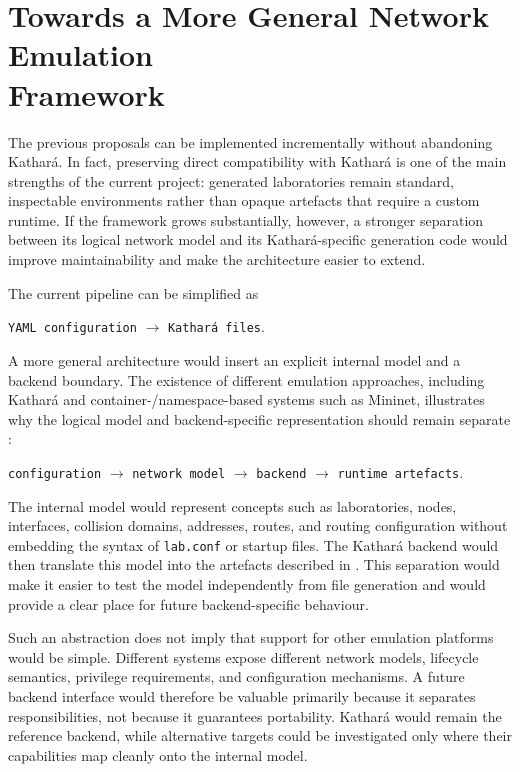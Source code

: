 \section[Towards a More General Network Emulation Framework]{Towards a More General Network Emulation\\Framework}
\label{sec:future-general-framework}

The previous proposals can be implemented incrementally without abandoning
Kathar\'a. In fact, preserving direct compatibility with Kathar\'a is one of the
main strengths of the current project: generated laboratories remain standard,
inspectable environments rather than opaque artefacts that require a custom
runtime. If the framework grows substantially, however, a stronger separation
between its logical network model and its Kathar\'a-specific generation code
would improve maintainability and make the architecture easier to extend.

The current pipeline can be simplified as

\begin{center}
\texttt{YAML configuration} $\rightarrow$ \texttt{Kathar\'a files}.
\end{center}

A more general architecture would insert an explicit internal model and a
backend boundary. The existence of different emulation approaches, including
Kathar\'a and container-/namespace-based systems such as Mininet, illustrates
why the logical model and backend-specific representation should remain
separate \cite{scazzariello2020kathara,lantz2010network}:

\begin{center}
\texttt{configuration} $\rightarrow$ \texttt{network model}
$\rightarrow$ \texttt{backend} $\rightarrow$ \texttt{runtime artefacts}.
\end{center}

The internal model would represent concepts such as laboratories, nodes,
interfaces, collision domains, addresses, routes, and routing configuration
without embedding the syntax of \texttt{lab.conf} or startup files. The
Kathar\'a backend would then translate this model into the artefacts described
in . This separation would make it easier to
test the model independently from file generation and would provide a clear
place for future backend-specific behaviour.

Such an abstraction does not imply that support for other emulation platforms
would be simple. Different systems expose different network models, lifecycle
semantics, privilege requirements, and configuration mechanisms. A future
backend interface would therefore be valuable primarily because it separates
responsibilities, not because it guarantees portability. Kathar\'a would remain
the reference backend, while alternative targets could be investigated only
where their capabilities map cleanly onto the internal model.

